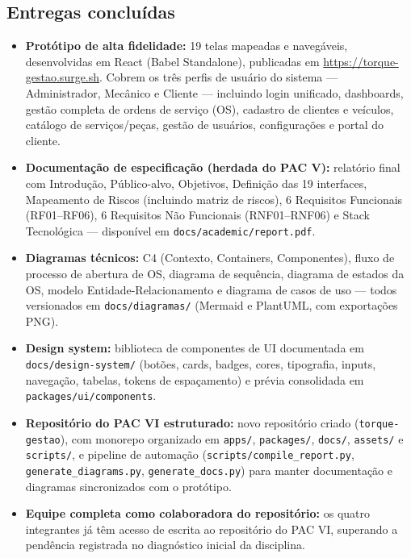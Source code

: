 \documentclass[11pt, a4paper]{article}
\begin{document}
\subsection{Entregas concluídas}

\begin{itemize}
    \item \textbf{Protótipo de alta fidelidade:} 19 telas mapeadas e navegáveis, desenvolvidas em React (Babel Standalone), publicadas em \url{https://torque-gestao.surge.sh}. Cobrem os três perfis de usuário do sistema --- Administrador, Mecânico e Cliente --- incluindo login unificado, dashboards, gestão completa de ordens de serviço (OS), cadastro de clientes e veículos, catálogo de serviços/peças, gestão de usuários, configurações e portal do cliente.
    \item \textbf{Documentação de especificação (herdada do PAC V):} relatório final com Introdução, Público-alvo, Objetivos, Definição das 19 interfaces, Mapeamento de Riscos (incluindo matriz de riscos), 6 Requisitos Funcionais (RF01--RF06), 6 Requisitos Não Funcionais (RNF01--RNF06) e Stack Tecnológica --- disponível em \texttt{docs/academic/report.pdf}.
    \item \textbf{Diagramas técnicos:} C4 (Contexto, Containers, Componentes), fluxo de processo de abertura de OS, diagrama de sequência, diagrama de estados da OS, modelo Entidade-Relacionamento e diagrama de casos de uso --- todos versionados em \texttt{docs/diagramas/} (Mermaid e PlantUML, com exportações PNG).
    \item \textbf{Design system:} biblioteca de componentes de UI documentada em \texttt{docs/design-system/} (botões, cards, badges, cores, tipografia, inputs, navegação, tabelas, tokens de espaçamento) e prévia consolidada em \texttt{packages/ui/components}.
    \item \textbf{Repositório do PAC VI estruturado:} novo repositório criado (\texttt{torque-gestao}), com monorepo organizado em \texttt{apps/}, \texttt{packages/}, \texttt{docs/}, \texttt{assets/} e \texttt{scripts/}, e pipeline de automação (\texttt{scripts/compile\_report.py}, \texttt{generate\_diagrams.py}, \texttt{generate\_docs.py}) para manter documentação e diagramas sincronizados com o protótipo.
    \item \textbf{Equipe completa como colaboradora do repositório:} os quatro integrantes já têm acesso de escrita ao repositório do PAC VI, superando a pendência registrada no diagnóstico inicial da disciplina.
\end{itemize}
\end{document}
